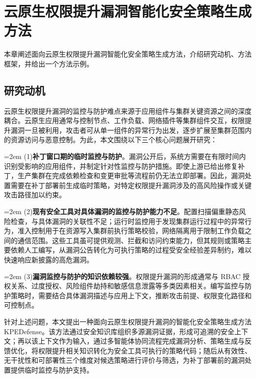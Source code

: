
\chapter{云原生权限提升漏洞智能化安全策略生成方法}\label{chap:method}


本章阐述面向云原生权限提升漏洞智能化安全策略生成方法，介绍研究动机、方法框架，并给出一个方法示例。

\section{研究动机}

云原生权限提升漏洞的监控与防护难点来源于应用组件与集群关键资源之间的深度耦合。云原生应用通常与控制节点、工作负载、网络插件等集群组件交互，权限提升漏洞一旦被利用，攻击者可从单一组件的异常行为出发，逐步扩展至集群范围内的资源访问与恶意控制。为此，本文围绕以下三个核心问题展开研究：

\noindent\hangindent=2em (1)\textbf{补丁窗口期的临时监控与防护}。漏洞公开后，系统方需要在有限时间内识别受影响的应用组件，并制定针对性监控与防护措施。即使上游已给出修复补丁，生产集群在完成依赖检查和变更审批等流程前仍无法立即部署。因此，漏洞处置需要在补丁部署前生成临时策略，对特定权限提升漏洞涉及的高风险操作或关键攻击路径加以约束。

\noindent\hangindent=2em (2)\textbf{现有安全工具对具体漏洞的监控与防护能力不足}。配置扫描\cite{shamim2025prescription,k8smanifests2023}偏重静态风险检查，与具体漏洞的关联性不足；运行时监控\cite{falco2025}用于发现集群运行过程中的异常行为，准入控制\cite{opa2025,kyverno2025}用于在资源写入集群前执行策略校验，网络隔离\cite{Minna_2021,Budigiri_2021}用于限制工作负载之间的通信范围。这些工具虽可提供观测、拦截和访问约束能力，但其规则或策略主要依赖人工编写，从漏洞公告转化为可执行策略的过程受安全经验差异制约，难以快速响应新披露的高危漏洞。

\noindent\hangindent=2em (3)\textbf{漏洞监控与防护的知识依赖较强}。权限提升漏洞的形成通常与 RBAC 授权关系\cite{ferraiolo1995role}、过度授权\cite{yang2023take}、风险组件劫持和敏感信息泄露\cite{kubeguard_icws2025}等多类因素相关。编写监控与防护策略时，需要结合具体漏洞描述与应用上下文，推断攻击前提、权限变化路径和可控制点。

针对上述问题，本文提出一种面向云原生权限提升漏洞的智能化安全策略生成方法KPEDefense。该方法通过安全知识库组织多源漏洞证据，形成可追溯的安全上下文；再以该上下文作为输入，通过多智能体协同流程完成漏洞分析、策略生成与反馈优化，将权限提升相关知识转化为安全工具可执行的策略代码；随后从有效性、无干扰性和可部署性三个维度对候选策略进行评价与筛选，为补丁部署前的漏洞处置提供临时监控与防护支持。

